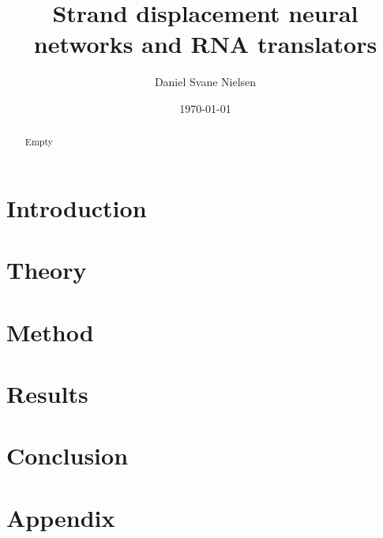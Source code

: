 \documentclass{report}
\title{Strand displacement neural networks and RNA translators}
\author{Daniel Svane Nielsen}
\date{\today}
\begin{document}
  \maketitle

  \begin{abstract}
  Empty
  \end{abstract}

  \tableofcontents

  \chapter{Introduction}
  
  \chapter{Theory}
  
  
  \chapter{Method}
  
  \chapter{Results}
  
  \chapter{Conclusion}
  

  
  

  \appendix
  \chapter{Appendix}
  
  
\end{document}
